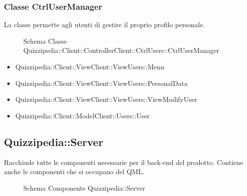 \subsubsection{Classe CtrlUserManager}
La classe permette agli utenti di gestire il proprio profilo personale.
\begin{figure}[H]
\centering
\noindent{}
\caption[Schema Classe CtrlUserManager]{Schema Classe Quizzipedia::Client::ControllerClient::CtrlUsers::CtrlUserManager}
\end{figure}
\begin{itemize}
\item Quizzipedia::Client::ViewClient::ViewUsers::Menu
\item Quizzipedia::Client::ViewClient::ViewUsers::PersonalData
\item Quizzipedia::Client::ViewClient::ViewUsers::ViewModifyUser
\end{itemize}
\begin{itemize}
\item Quizzipedia::Client::ModelClient::Users::User
\end{itemize}
\subsection{Quizzipedia::Server}
Racchiude tutte le componenti necessarie per il back-end del prodotto. Contiene anche le componenti che si occupano del QML.
\begin{figure}[H]
\centering
\noindent{}
\caption[Schema Componente Server]{Schema Componente Quizzipedia::Server}
\end{figure}
